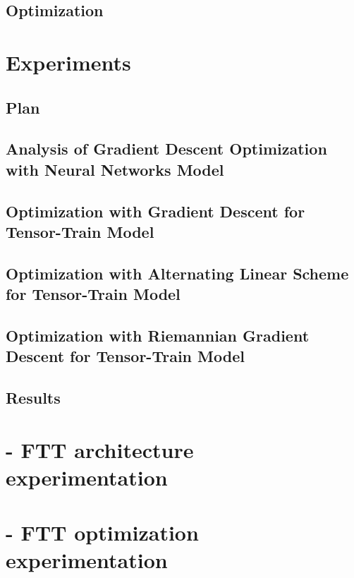 \documentclass[11pt]{article}
\begin{document}
    \subsection{Optimization}\label{subsec:optimization}
    



    \section{Experiments}\label{sec:experiments}

    \subsection{Plan}\label{subsec:plan}
    

    \subsection{Analysis of Gradient Descent Optimization with Neural Networks Model}
    \label{subsec:analysis-of-gradient-descent-optimization-with-neural-networks-model}

    \subsection{Optimization with Gradient Descent for Tensor-Train Model}\label{subsec:optimization-with-gradient-descent}
    

    \subsection{Optimization with Alternating Linear Scheme for Tensor-Train Model}\label{subsec:optimization-with-alternating-linear-scheme}
    

    \subsection{Optimization with Riemannian Gradient Descent for Tensor-Train Model}\label{subsec:optimization-with-riemannian-gradient-descent}
    

    \subsection{Results}\label{subsec:results}
    
    
    \appendix

    \begin{appendices}
        \section{- FTT architecture experimentation}\label{sec:on-ftt-architecture-experimentation}

        \section{- FTT optimization experimentation}\label{sec:on-ftt-optimization-experimentation}
    \end{appendices}
\end{document}
